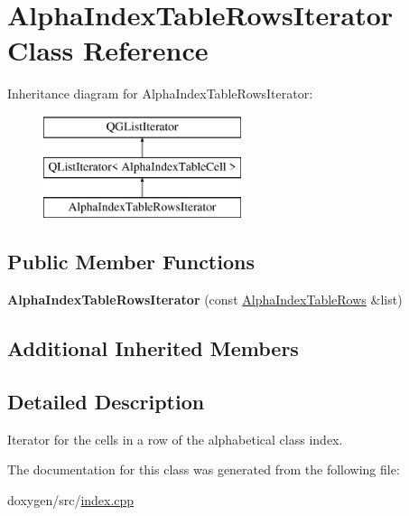 \hypertarget{class_alpha_index_table_rows_iterator}{}\section{Alpha\+Index\+Table\+Rows\+Iterator Class Reference}
\label{class_alpha_index_table_rows_iterator}
Inheritance diagram for Alpha\+Index\+Table\+Rows\+Iterator\+:\begin{figure}[H]
\begin{center}
\leavevmode
\includegraphics[height=3.000000cm]{class_alpha_index_table_rows_iterator}
\end{center}
\end{figure}
\subsection*{Public Member Functions}
\begin{DoxyCompactItemize}
\item 
\mbox{\label{class_alpha_index_table_rows_iterator_af4dfd3a88c6e9da47903727f9c6df44f}} 
{\bfseries Alpha\+Index\+Table\+Rows\+Iterator} (const \mbox{\hyperlink{class_alpha_index_table_rows}{Alpha\+Index\+Table\+Rows}} \&list)
\end{DoxyCompactItemize}
\subsection*{Additional Inherited Members}


\subsection{Detailed Description}
Iterator for the cells in a row of the alphabetical class index. 

The documentation for this class was generated from the following file\+:\begin{DoxyCompactItemize}
\item 
doxygen/src/\mbox{\hyperlink{index_8cpp}{index.\+cpp}}\end{DoxyCompactItemize}
